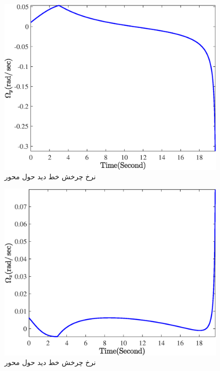 \begin{figure}[H]
	\centering
	\includegraphics[width=.75\linewidth]{../Figure/Q1/a/Omega_y}
	\caption{نرخ چرخش خط دید حول محور }
\end{figure}

\begin{figure}[H]
	\centering
	\includegraphics[width=.75\linewidth]{../Figure/Q1/a/Omega_z}
	\caption{نرخ چرخش خط دید حول محور }
\end{figure}
